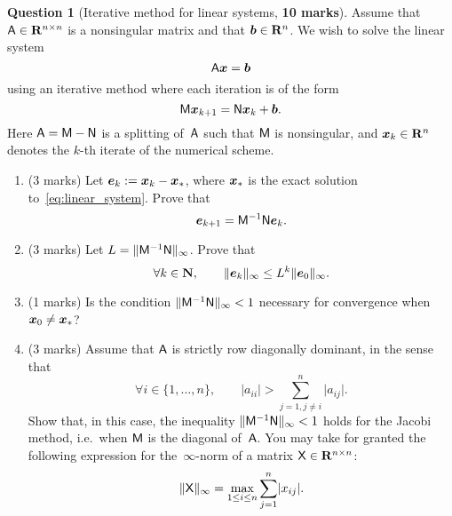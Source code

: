 \documentclass[11pt]{article}
\theoremstyle{definition}
\newtheorem{question}{Question}
\begin{document}
\newpage
\begin{question}
    [Iterative method for linear systems, \textbf{10 marks}]
    Assume that $\mathsf A \in \mathbf R^{n \times n}$ is a nonsingular matrix and that $\mathbf{\boldsymbol{b}} \in \mathbf R^n$.
    We wish to solve the linear system
    \begin{equation}
        \label{eq:linear_system}
        \mathsf A \mathbf{\boldsymbol{x}} = \mathbf{\boldsymbol{b}}
    \end{equation}
    using an iterative method where each iteration is of the form
    \[
        \mathsf M \mathbf{\boldsymbol{x}}_{k+1} = \mathsf N \mathbf{\boldsymbol{x}}_k + \mathbf{\boldsymbol{b}}.
    \]
    Here $\mathsf A = \mathsf M - \mathsf N$ is a splitting of~$\mathsf A$ such that $\mathsf M$ is nonsingular,
    and $\mathbf{\boldsymbol{x}}_k \in \mathbf R^n$ denotes the $k$-th iterate of the numerical scheme.

    \begin{enumerate}
        \item
            (3 marks)
            Let $\mathbf{\boldsymbol{e}}_k := \mathbf{\boldsymbol{x}}_k - \mathbf{\boldsymbol{x}}_*$,
            where $\mathbf{\boldsymbol{x}}_*$ is the exact solution to~\eqref{eq:linear_system}.
            Prove that
            \[
                \mathbf{\boldsymbol{e}}_{k+1} = \mathsf M^{-1} \mathsf N \mathbf{\boldsymbol{e}}_k.
            \]

        \item
            (3 marks)
            Let $L = \lVert\mathsf M^{-1} \mathsf N\rVert_{\infty}$.
            Prove that
            \[
                \forall k \in \mathbf N, \qquad
                \lVert\mathbf{\boldsymbol{e}}_k\rVert_{\infty} \leq L^k \lVert\mathbf{\boldsymbol{e}}_0\rVert_{\infty}.
            \]

        \item
            (1 marks)
            Is the condition $\lVert\mathsf M^{-1} \mathsf N\rVert_{\infty} < 1$ necessary
            for convergence when $\mathbf{\boldsymbol{x}}_0 \neq \mathbf{\boldsymbol{x}}_*$?

        \item
            (3 marks)
            Assume that $\mathsf A$ is strictly row diagonally dominant, in the sense that
            \[
                \forall i \in \{1, \dotsc, n\}, \qquad
                \lvert a_{ii} \rvert > \sum_{j=1, j\neq i}^{n} \lvert a_{ij} \rvert.
            \]
            Show that, in this case, the inequality $\lVert\mathsf M^{-1} \mathsf N\rVert_{\infty} < 1$ holds for the Jacobi method,
            i.e.\ when $\mathsf M$ is the diagonal of~$\mathsf A$.
            You may take for granted the following expression for the~$\infty$-norm of a matrix $\mathsf X \in \mathbf R^{n \times n}$:
            \[
                \lVert\mathsf X\rVert_{\infty} = \max_{1 \leq i \leq n} \sum_{j=1}^{n} \lvert x_{ij}\rvert.
            \]


\end{enumerate}
\end{question}
\end{document}

